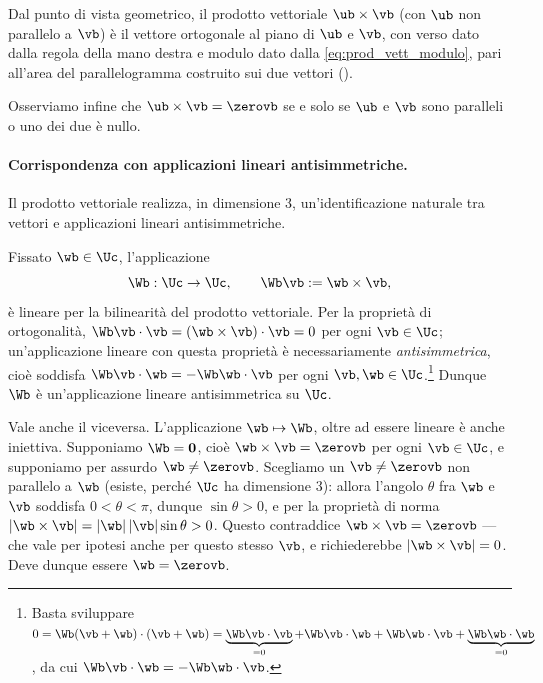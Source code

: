 Dal punto di vista geometrico, il prodotto vettoriale $\ub \times \vb$ (con $\ub$ non parallelo a $\vb$) è il vettore ortogonale al piano
di $\ub$ e $\vb$, con verso dato dalla regola della mano destra e modulo dato dalla
\eqref{eq:prod_vett_modulo}, 
pari all'area del parallelogramma costruito sui due vettori
().

Osserviamo infine che  $\ub \times \vb = \zerovb$ se e solo se $\ub$ e $\vb$
	sono paralleli o uno dei due è nullo.








\paragraph{Corrispondenza con applicazioni lineari antisimmetriche.}
Il prodotto vettoriale realizza, in dimensione 3, un'identificazione naturale
tra vettori e applicazioni lineari antisimmetriche.

Fissato $\wb\in\Uc$, l'applicazione
\begin{equation}
	\Wb:\Uc\to\Uc, \qquad \Wb\vb:=\wb\times\vb,
\end{equation}
è lineare per la bilinearità del prodotto vettoriale. Per la proprietà di
ortogonalità, $\Wb\vb\cdot\vb=(\wb\times\vb)\cdot\vb=0$ per ogni $\vb\in\Uc$;
un'applicazione lineare  con questa proprietà è necessariamente
\emph{antisimmetrica}, cioè soddisfa $\Wb\vb\cdot\wb=-\Wb\wb\cdot\vb$ per ogni
$\vb,\wb\in\Uc$.\footnote{Basta sviluppare
	$0=\Wb(\vb+\wb)\cdot(\vb+\wb)=\underbrace{\Wb\vb\cdot\vb}_{=0}+\Wb\vb\cdot\wb
	+\Wb\wb\cdot\vb+\underbrace{\Wb\wb\cdot\wb}_{=0}$, da cui
	$\Wb\vb\cdot\wb=-\Wb\wb\cdot\vb$.} Dunque $\Wb$ è un'applicazione lineare antisimmetrica
su $\Uc$.

Vale anche il viceversa. L'applicazione $\wb\mapsto\Wb$, oltre ad essere lineare  è anche 
	iniettiva. Supponiamo $\Wb=\mathbf 0$, cioè $\wb\times\vb=\zerovb$ per ogni
	$\vb\in\Uc$, e supponiamo per assurdo $\wb\neq\zerovb$. Scegliamo un
	$\vb\neq\zerovb$ non parallelo a $\wb$ (esiste, perché $\Uc$ ha dimensione
	$3$): allora l'angolo $\theta$ fra $\wb$ e $\vb$ soddisfa $0<\theta<\pi$, dunque
	$\sin\theta>0$, e per la proprietà di norma
	$|\wb\times\vb|=|\wb|\,|\vb|\sin\theta>0$. Questo contraddice
	$\wb\times\vb=\zerovb$ --- che vale per ipotesi anche per questo stesso $\vb$, e
	richiederebbe $|\wb\times\vb|=0$. Deve dunque essere $\wb=\zerovb$.
	
